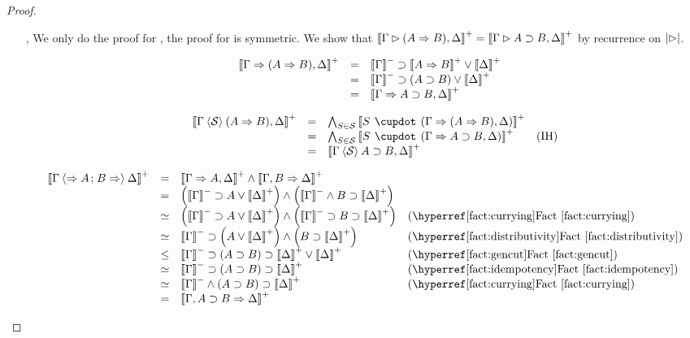 \begin{proof}
\begin{itemize}
    \item[\rsf{{\limp}{+}}, \rsf{{\lsub}{-}}]
    We only do the proof for \rsf{{\limp}{+}}, the proof for \rsf{{\lsub}{-}} is
    symmetric. We show that $\left\llbracket \Gamma \mathbin{\rhd} (A \Rightarrow B), \Delta \right\rrbracket^+ =
    \left\llbracket \Gamma \mathbin{\rhd} A \supset B, \Delta \right\rrbracket^+$ by recurrence on $\left|\mathbin{\rhd}\right|$.
    \begin{itemize}
      \item[\bcase]
      $$
      \begin{array}{rcll}
        \left\llbracket \Gamma \Rightarrow (A \Rightarrow B), \Delta \right\rrbracket^+
        &=& \left\llbracket \Gamma \right\rrbracket^-\supset \left\llbracket A \Rightarrow B \right\rrbracket^+ \lor \left\llbracket \Delta \right\rrbracket^+ & \\
        &=& \left\llbracket \Gamma \right\rrbracket^-\supset (A \supset B) \lor \left\llbracket \Delta \right\rrbracket^+ & \\
        &=& \left\llbracket \Gamma \Rightarrow A \supset B, \Delta \right\rrbracket^+
      \end{array}
      $$
      \item[\rcase]
      $$
      \begin{array}{rcll}
        \psint{\Gamma \piq{\cS} (A \seq B), \Delta}
        &=& \psintAndMix{S}{\cS}{\Gamma}{(A \seq B), \Delta} & \\
        &=& \psintAndMix{S}{\cS}{\Gamma}{A \limp B, \Delta} &\text{(IH)} \\
        &=& \psint{\Gamma \piq{\cS} A \limp B, \Delta} & \\
      \end{array}
      $$
    \end{itemize}
    
    \item[\rsf{{\limp}{-}}]
    $$
    \begin{array}{rcll}
      \psint{\Gamma \piq{\seq A \sep B \seq} \Delta}
      &=& \psint{\Gamma \seq A, \Delta} \land \psint{\Gamma, B \seq \Delta} & \\
      &=& \left(\nsint{\Gamma} \limp A \lor \psint{\Delta} \right) \land \left(\nsint{\Gamma} \land B \limp \psint{\Delta} \right) & \\
      &\semequiv& \left(\nsint{\Gamma} \limp A \lor \psint{\Delta} \right) \land \left(\nsint{\Gamma} \limp B \limp \psint{\Delta} \right) &\text{(\reffact{currying})} \\
      &\semequiv& \nsint{\Gamma} \limp \left(A \lor \psint{\Delta} \right) \land \left(B \limp \psint{\Delta} \right) &\text{(\reffact{distributivity})} \\
      &\sement& \nsint{\Gamma} \limp (A \limp B) \limp \psint{\Delta} \lor \psint{\Delta} &\text{(\reffact{gencut})} \\
      &\semequiv& \nsint{\Gamma} \limp (A \limp B) \limp \psint{\Delta} &\text{(\reffact{idempotency})} \\
      &\semequiv& \nsint{\Gamma} \land (A \limp B) \limp \psint{\Delta} &\text{(\reffact{currying})} \\
      &=& \psint{\Gamma, A \limp B \seq \Delta} & \\
    \end{array}
    $$


\end{itemize}
\end{proof}
